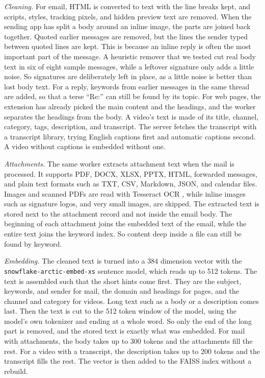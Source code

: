 \documentclass[conference]{IEEEtran}
\newcommand{\embmodel}{\texttt{snowflake\allowbreak-arctic\allowbreak-embed\allowbreak-xs}}
\newcommand{\embdim}{384}
\begin{document}
\textit{Cleaning.} For email, HTML is converted to text with the line breaks kept, and scripts, styles, tracking pixels, and hidden preview text are removed. When the sending app has split a body around an inline image, the parts are joined back together. Quoted earlier messages are removed, but the lines the sender typed between quoted lines are kept. This is because an inline reply is often the most important part of the message. A heuristic remover that we tested cut real body text in six of eight sample messages, while a leftover signature only adds a little noise. So signatures are deliberately left in place, as a little noise is better than lost body text. For a reply, keywords from earlier messages in the same thread are added, so that a terse ``Re:'' can still be found by its topic. For web pages, the extension has already picked the main content and the headings, and the worker separates the headings from the body. A video's text is made of its title, channel, category, tags, description, and transcript. The server fetches the transcript with a transcript library, trying English captions first and automatic captions second. A video without captions is embedded without one.

\textit{Attachments.} The same worker extracts attachment text when the mail is processed. It supports PDF, DOCX, XLSX, PPTX, HTML, forwarded messages, and plain text formats such as TXT, CSV, Markdown, JSON, and calendar files. Images and scanned PDFs are read with Tesseract OCR \cite{b15}, while inline images such as signature logos, and very small images, are skipped. The extracted text is stored next to the attachment record and not inside the email body. The beginning of each attachment joins the embedded text of the email, while the entire text joins the keyword index. So content deep inside a file can still be found by keyword.

\textit{Embedding.} The cleaned text is turned into a \embdim{} dimension vector with the \embmodel{} sentence model, which reads up to 512 tokens. The text is assembled such that the short hints come first. They are the subject, keywords, and sender for mail, the domain and headings for pages, and the channel and category for videos. Long text such as a body or a description comes last. Then the text is cut to the 512 token window of the model, using the model's own tokenizer and ending at a whole word. So only the end of the long part is removed, and the stored text is exactly what was embedded. For mail with attachments, the body takes up to 300 tokens and the attachments fill the rest. For a video with a transcript, the description takes up to 200 tokens and the transcript fills the rest. The vector is then added to the FAISS index without a rebuild.
\end{document}
